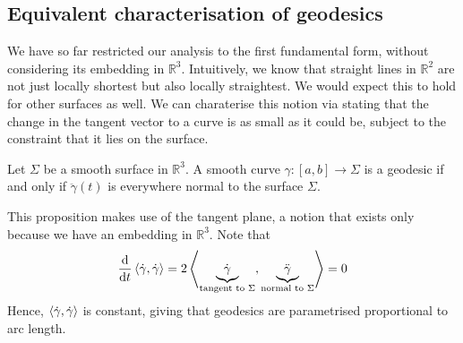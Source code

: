 \documentclass[a4paper]{article}
\begin{document}
\subsection{Equivalent characterisation of geodesics}
We have so far restricted our analysis to the first fundamental form, without considering its embedding in \( \mathbb R^3 \).
Intuitively, we know that straight lines in \( \mathbb R^2 \) are not just locally shortest but also locally straightest.
We would expect this to hold for other surfaces as well.
We can charaterise this notion via stating that the change in the tangent vector to a curve is as small as it could be, subject to the constraint that it lies on the surface.

\begin{proposition}
	Let \( \Sigma \) be a smooth surface in \( \mathbb R^3 \).
	A smooth curve \( \gamma \colon [a,b] \to \Sigma \) is a geodesic if and only if \( \ddot \gamma(t) \) is everywhere normal to the surface \( \Sigma \).
\end{proposition}
\begin{remark}
	This proposition makes use of the tangent plane, a notion that exists only because we have an embedding in \( \mathbb R^3 \).
	Note that
	\[
		\dv{t} \left\langle{\dot \gamma, \dot \gamma}\right\rangle = 2 \left\langle{\underbrace{\dot \gamma}_{\text{tangent to } \Sigma}, \underbrace{\ddot \gamma}_{\text{normal to } \Sigma}}\right\rangle = 0
	\]
	Hence, \( \left\langle{\dot \gamma, \dot \gamma}\right\rangle \) is constant, giving that geodesics are parametrised proportional to arc length.
\end{remark}
\end{document}
